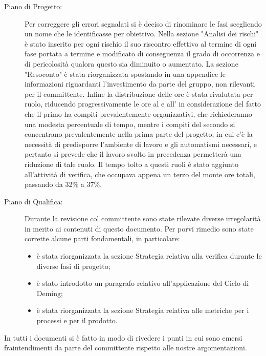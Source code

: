 \begin{description}
\item[Piano di Progetto:] Per correggere gli errori segnalati si è deciso di rinominare le fasi scegliendo un nome che le identificasse per obiettivo. Nella sezione "Analisi dei rischi" è stato inserito per ogni rischio il suo riscontro effettivo al termine di ogni fase portata a termine e modificato di conseguenza il grado di occorrenza e di pericolosità qualora questo sia diminuito o aumentato. La sezione "Resoconto" è stata riorganizzata spostando in una appendice le informazioni riguardanti l'investimento da parte del gruppo, non rilevanti per il committente. Infine la distribuzione delle ore è stata rivalutata per ruolo, riducendo progressivamente le ore al  e all' in considerazione del fatto che il primo ha compiti prevalentemente organizzativi, che richiederanno una modesta percentuale di tempo, mentre i compiti del secondo si concentrano prevalentemente nella prima parte del progetto, in cui c'è la necessità di predisporre l'ambiente di lavoro e gli automatismi necessari, e pertanto si prevede che il lavoro svolto in precedenza permetterà una riduzione di tale ruolo. Il tempo tolto a questi ruoli è stato aggiunto all'attività di verifica, che occupava appena un terzo del monte ore totali, passando da 32\% a 37\%.
\item[Piano di Qualifica:] Durante la revisione col committente sono state rilevate diverse irregolarità in merito ai contenuti di questo documento. Per porvi rimedio sono state corrette alcune parti fondamentali, in particolare:
\begin{itemize}
\item è stata riorganizzata la sezione Strategia relativa alla verifica durante le diverse fasi di progetto;
\item è stato introdotto un paragrafo relativo all'applicazione del Ciclo di Deming;
\item è stata riorganizzata la sezione Strategia relativa alle metriche per i processi e per il prodotto.
\end{itemize}
\end{description}
In tutti i documenti si è fatto in modo di rivedere i punti in cui sono emersi fraintendimenti da parte del committente rispetto alle nostre argomentazioni.